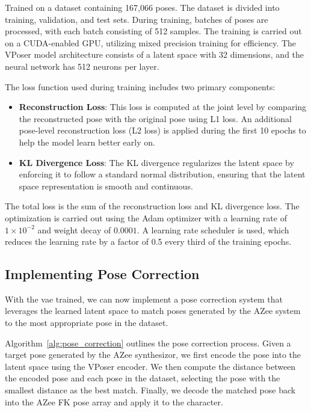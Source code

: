 \documentclass[../../main.tex]{subfiles}
\begin{document}
Trained on a dataset containing 167,066 poses. The dataset is divided into training, validation, and test sets. During training, batches of poses are processed, with each batch consisting of 512 samples. The training is carried out on a CUDA-enabled GPU, utilizing mixed precision training for efficiency. The VPoser model architecture consists of a latent space with 32 dimensions, and the neural network has 512 neurons per layer. 

The loss function used during training includes two primary components: 
\begin{itemize}
    \item \textbf{Reconstruction Loss}: This loss is computed at the joint level by comparing the reconstructed pose with the original pose using L1 loss. An additional pose-level reconstruction loss (L2 loss) is applied during the first 10 epochs to help the model learn better early on.
    \item \textbf{KL Divergence Loss}: The KL divergence regularizes the latent space by enforcing it to follow a standard normal distribution, ensuring that the latent space representation is smooth and continuous.
\end{itemize}

The total loss is the sum of the reconstruction loss and KL divergence loss. The optimization is carried out using the Adam optimizer with a learning rate of $1 \times 10^{-2}$ and weight decay of $0.0001$. A learning rate scheduler is used, which reduces the learning rate by a factor of 0.5 every third of the training epochs. 

\subsection{Implementing Pose Correction}
\label{ch:pose_correction:pose_correction_with_azee:implementation}

With the \gls{vae} trained, we can now implement a pose correction system that leverages the learned latent space to match poses generated by the AZee system to the most appropriate pose in the dataset.

Algorithm~\ref{alg:pose_correction} outlines the pose correction process. Given a target pose generated by the AZee synthesizor, we first encode the pose into the latent space using the VPoser encoder. We then compute the distance between the encoded pose and each pose in the dataset, selecting the pose with the smallest distance as the best match. Finally, we decode the matched pose back into the AZee FK pose array and apply it to the character.
\end{document}
